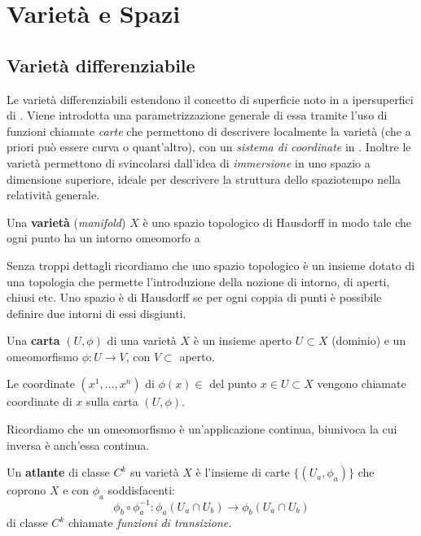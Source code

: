 \chapter{Varietà e Spazi}
\section{Varietà differenziabile}
Le varietà differenziabili estendono il concetto di superficie noto in  a ipersuperfici di . Viene introdotta una parametrizzazione generale di essa tramite l'uso di funzioni chiamate \textit{carte} che permettono di descrivere localmente la varietà (che a priori può essere curva o quant'altro), con un \textit{sistema di coordinate} in . Inoltre le varietà permettono di svincolarsi dall'idea di \textit{immersione} in uno spazio a dimensione superiore, ideale per descrivere la struttura dello spaziotempo nella relatività generale.

\begin{definizione}
Una \textbf{varietà} (\textit{manifold}) $X$ è uno spazio topologico di Hausdorff in modo tale che ogni punto ha un intorno omeomorfo a 
\end{definizione}

Senza troppi dettagli ricordiamo che uno spazio topologico è un insieme dotato di una topologia che permette l'introduzione della nozione di intorno, di aperti, chiusi etc.
Uno spazio è di Hausdorff se per ogni coppia di punti è possibile definire due intorni di essi disgiunti.

\begin{definizione}
Una \textbf{carta} $(U,\phi)$ di una varietà $X$ è un insieme aperto $U\subset X$ (dominio) e un omeomorfismo $\phi : U \rightarrow V$, con $V\subset$  aperto.

Le coordinate $(x^1,\dots,x^n)$ di $\phi(x)\in$  del punto $x \in U \subset X$ vengono chiamate coordinate di $x$ sulla carta $(U,\phi)$.
\end{definizione}

Ricordiamo che un omeomorfismo è un'applicazione continua, biunivoca la cui inversa è anch'essa continua.

\begin{definizione}
Un \textbf{atlante} di classe $C^k$ su varietà $X$ è l'insieme di carte $\{(U_a, \phi_a)\}$ che coprono $X$ e con $\phi_a$ soddisfacenti:
\begin{equation*}
    \phi _b \circ \phi_a^{-1} : \phi_a(U_a \cap U_b) \rightarrow \phi _b(U_a \cap U_b)
\end{equation*}
di classe $C^k$ chiamate \textit{funzioni di transizione.}
\end{definizione}

